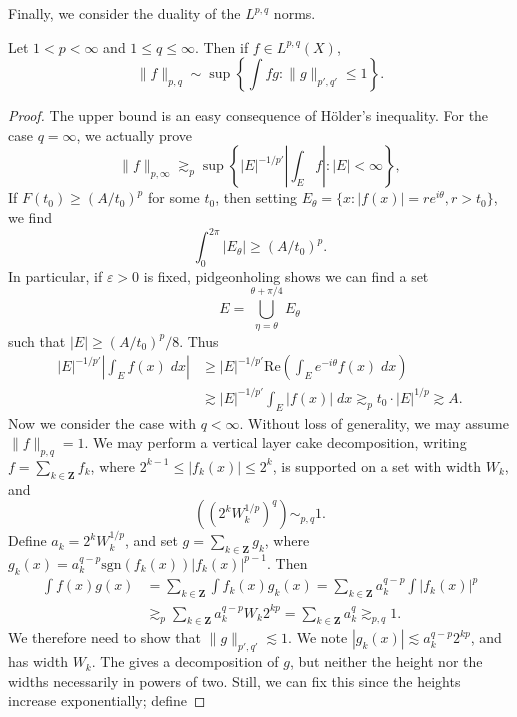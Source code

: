 Finally, we consider the duality of the $L^{p,q}$ norms.

\begin{theorem}
    Let $1 < p < \infty$ and $1 \leq q \leq \infty$. Then if $f \in L^{p,q}(X)$,
    \[ \| f \|_{p,q} \sim \sup \left\{ \int fg : \| g \|_{p',q'} \leq 1 \right\}. \]
\end{theorem}
\begin{proof}
    The upper bound is an easy consequence of H\"{o}lder's inequality. For the case $q = \infty$, we actually prove
    \[ \| f \|_{p,\infty} \gtrsim_p \sup \left\{ |E|^{-1/p'} \left| \int_E f \right| : |E| < \infty \right\}, \]
    If $F(t_0) \geq (A/t_0)^p$ for some $t_0$, then setting $E_\theta = \{ x : |f(x)| = re^{i\theta}, r > t_0 \}$, we find
    \[ \int_0^{2\pi} |E_\theta| \geq (A/t_0)^p. \]
    In particular, if $\varepsilon > 0$ is fixed, pidgeonholing shows we can find a set
    \[ E = \bigcup_{\eta = \theta}^{\theta + \pi/4} E_\theta \]
    such that $|E| \geq (A/t_0)^p/8$. Thus
    \begin{align*}
        |E|^{-1/p'} \left| \int_E f(x)\; dx \right| &\geq |E|^{-1/p'} \text{Re} \left( \int_Ee^{-i\theta} f(x)\; dx \right)\\
        &\gtrsim |E|^{-1/p'} \int_E |f(x)|\; dx \gtrsim_p t_0 \cdot |E|^{1/p} \gtrsim A.
    \end{align*}
    Now we consider the case with $q < \infty$. Without loss of generality, we may assume $\| f \|_{p,q} = 1$. We may perform a vertical layer cake decomposition, writing $f = \sum_{k \in \mathbf{Z}} f_k$, where $2^{k-1} \leq |f_k(x)| \leq 2^k$, is supported on a set with width $W_k$, and
    \[ \left( (2^k W_k^{1/p})^q \right) \sim_{p,q} 1. \]
    Define $a_k = 2^k W_k^{1/p}$, and set $g = \sum_{k \in \mathbf{Z}} g_k$, where $g_k(x) = a_k^{q-p} \text{sgn}(f_k(x)) |f_k(x)|^{p-1}$. Then
    \begin{align*}
        \int f(x) g(x) &= \sum_{k \in \mathbf{Z}} \int f_k(x) g_k(x) = \sum_{k \in \mathbf{Z}} a_k^{q-p} \int |f_k(x)|^p\\
        &\gtrsim_p \sum_{k \in \mathbf{Z}} a_k^{q-p} W_k 2^{kp} = \sum_{k \in \mathbf{Z}} a_k^q \gtrsim_{p,q} 1.
    \end{align*}
    We therefore need to show that $\| g \|_{p',q'} \lesssim 1$. We note $|g_k(x)| \lesssim a_k^{q-p} 2^{kp}$, and has width $W_k$. The gives a decomposition of $g$, but neither the height nor the widths necessarily in powers of two. Still, we can fix this since the heights increase exponentially; define

\end{proof}

